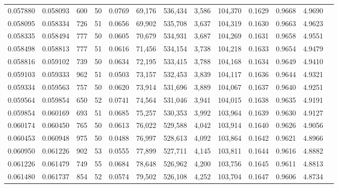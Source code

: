 \begin{tabular}{rrrrrrrrrrrrr}
0.057880 & 0.058093 &   600 &  50 &                                     0.0769 &  69,176 & 536,434 &   3,586 & 104,370 & 0.1629 & 0.9668 & 4.9690 \\
0.058095 & 0.058334 &   726 &  51 &                                     0.0656 &  69,902 & 535,708 &   3,637 & 104,319 & 0.1630 & 0.9663 & 4.9623 \\
0.058335 & 0.058494 &   777 &  50 &                                     0.0605 &  70,679 & 534,931 &   3,687 & 104,269 & 0.1631 & 0.9658 & 4.9551 \\
0.058498 & 0.058813 &   777 &  51 &                                     0.0616 &  71,456 & 534,154 &   3,738 & 104,218 & 0.1633 & 0.9654 & 4.9479 \\
0.058816 & 0.059102 &   739 &  50 &                                     0.0634 &  72,195 & 533,415 &   3,788 & 104,168 & 0.1634 & 0.9649 & 4.9410 \\
0.059103 & 0.059333 &   962 &  51 &                                     0.0503 &  73,157 & 532,453 &   3,839 & 104,117 & 0.1636 & 0.9644 & 4.9321 \\
0.059334 & 0.059563 &   757 &  50 &                                     0.0620 &  73,914 & 531,696 &   3,889 & 104,067 & 0.1637 & 0.9640 & 4.9251 \\
0.059564 & 0.059854 &   650 &  52 &                                     0.0741 &  74,564 & 531,046 &   3,941 & 104,015 & 0.1638 & 0.9635 & 4.9191 \\
0.059854 & 0.060169 &   693 &  51 &                                     0.0685 &  75,257 & 530,353 &   3,992 & 103,964 & 0.1639 & 0.9630 & 4.9127 \\
0.060174 & 0.060450 &   765 &  50 &                                     0.0613 &  76,022 & 529,588 &   4,042 & 103,914 & 0.1640 & 0.9626 & 4.9056 \\
0.060453 & 0.060948 &   975 &  50 &                                     0.0488 &  76,997 & 528,613 &   4,092 & 103,864 & 0.1642 & 0.9621 & 4.8966 \\
0.060950 & 0.061226 &   902 &  53 &                                     0.0555 &  77,899 & 527,711 &   4,145 & 103,811 & 0.1644 & 0.9616 & 4.8882 \\
0.061226 & 0.061479 &   749 &  55 &                                     0.0684 &  78,648 & 526,962 &   4,200 & 103,756 & 0.1645 & 0.9611 & 4.8813 \\
0.061480 & 0.061737 &   854 &  52 &                                     0.0574 &  79,502 & 526,108 &   4,252 & 103,704 & 0.1647 & 0.9606 & 4.8734 \\

\end{tabular}
